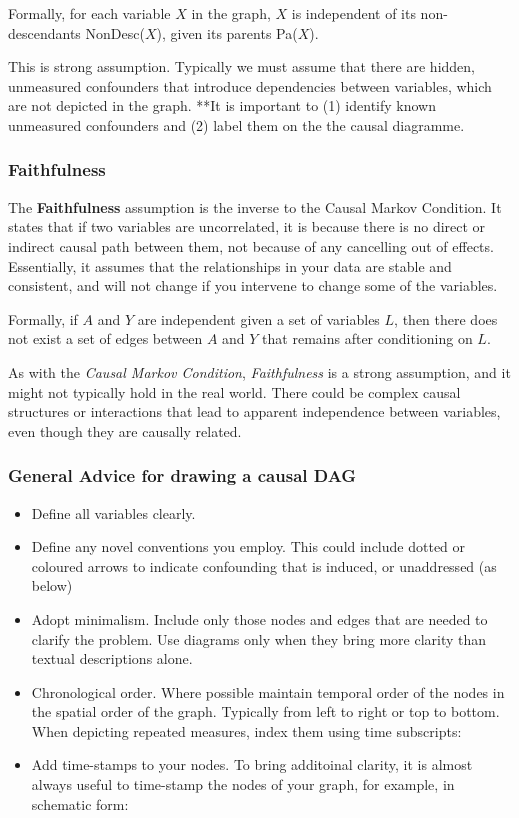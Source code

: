 \documentclass[
  singlecolumn]{report}
\providecommand{\tightlist}{%
  \setlength{\itemsep}{0pt}\setlength{\parskip}{0pt}}\usepackage{longtable,booktabs,array}
\begin{document}
Formally, for each variable \(X\) in the graph, \(X\) is independent of
its non-descendants NonDesc(\(X\)), given its parents Pa(\(X\)).

This is strong assumption. Typically we must assume that there are
hidden, unmeasured confounders that introduce dependencies between
variables, which are not depicted in the graph. **It is important to (1)
identify known unmeasured confounders and (2) label them on the the
causal diagramme.

\hypertarget{faithfulness}{%
\subsubsection{\texorpdfstring{\textbf{Faithfulness}}{Faithfulness}}\label{faithfulness}}

The \textbf{Faithfulness} assumption is the inverse to the Causal Markov
Condition. It states that if two variables are uncorrelated, it is
because there is no direct or indirect causal path between them, not
because of any cancelling out of effects. Essentially, it assumes that
the relationships in your data are stable and consistent, and will not
change if you intervene to change some of the variables.

Formally, if \(A\) and \(Y\) are independent given a set of variables
\(L\), then there does not exist a set of edges between \(A\) and \(Y\)
that remains after conditioning on \(L\).

As with the \emph{Causal Markov Condition}, \emph{Faithfulness} is a
strong assumption, and it might not typically hold in the real world.
There could be complex causal structures or interactions that lead to
apparent independence between variables, even though they are causally
related.

\hypertarget{general-advice-for-drawing-a-causal-dag}{%
\subsubsection{General Advice for drawing a causal
DAG}\label{general-advice-for-drawing-a-causal-dag}}

\begin{itemize}
\tightlist
\item
  Define all variables clearly.
\item
  Define any novel conventions you employ. This could include dotted or
  coloured arrows to indicate confounding that is induced, or
  unaddressed (as below)
\item
  Adopt minimalism. Include only those nodes and edges that are needed
  to clarify the problem. Use diagrams only when they bring more clarity
  than textual descriptions alone.
\item
  Chronological order. Where possible maintain temporal order of the
  nodes in the spatial order of the graph. Typically from left to right
  or top to bottom. When depicting repeated measures, index them using
  time subscripts:
\item
  Add time-stamps to your nodes. To bring additoinal clarity, it is
  almost always useful to time-stamp the nodes of your graph, for
  example, in schematic form:
\end{itemize}
\end{document}
